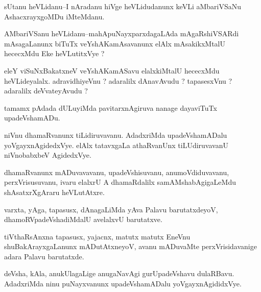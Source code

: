 \documentclass{article}
\begin{document}

\begin{mn}%
sUtanu heVLidanu--I nAradanu hiVge heVLidudanunx keVLi aMbariVSaNu AshacxrayxgoMDu iMteMdanu.
\end{mn}

\begin{mn}%
AMbariVSanu heVLidanu--mahApuNayxparxdagaLAda mAgaRshiVSARdi mAsagaLanunx biTuTx 
veYshAKamAsavanunx elAlx mAsakikxMtalU hececxMdu Eke heVLutitxVye ?
\end{mn}

\begin{mn}%
eleY viSuNxBakatxneV veYshAKamASavu elalxkiMtalU hececxMdu heVLideyalalx. adravidhiyeVnu ? 
adaralilx dAnavAvudu ? tapasesxVnu ? adaralilx deVvateyAvudu ?
\end{mn}

\begin{mn}%
tamamx pAdada dULuyiMda pavitarxnAgiruva nanage dayaviTuTx upadeVshamADu.
\end{mn}

\begin{mn}%
niVnu dhamaRvanunx tiLidiruvavanu. AdadxriMda upadeVshamADalu yoVgayxnAgidedxVye. elAlx 
tatavxgaLa athaRvanUnx tiLUdiruvavanU niVnobabxbeV AgidedxVye.
\end{mn}

\begin{mn}%
dhamaRvanunx mADuvavavanu, upadeVshisuvanu, anumoVdiduvavanu, perxVrisusuvanu, ivaru 
elalxrU A dhamaRdalilx samAMshabAgigaLeMdu shAsatxrXgAraru heVLutAtxre.
\end{mn}

\begin{mn}%
varxta, yAga, tapasusx, dAnagaLiMda yAva Palavu barutatxdeyoV, dhamoRVpadeVshadiMdalU 
avelalxvU barutatxve.
\end{mn}

\begin{mn}%
tiVthaRsAnxna tapasusx, yajacnx, matutx matutx EneVnu shuBakArayxgaLanunx mADutAtxneyoV, 
avanu mADuvaMte perxVrisidavanige adara Palavu barutatxde.
\end{mn}

\begin{mn}%
deVsha, kAla, anukUlagaLige anugaNavAgi gurUpadeVshavu dulaRBavu. AdadxriMda ninu 
puNayxvanunx upadeVshamADalu yoVgayxnAgididxVye.
\end{mn}
\end{document}
